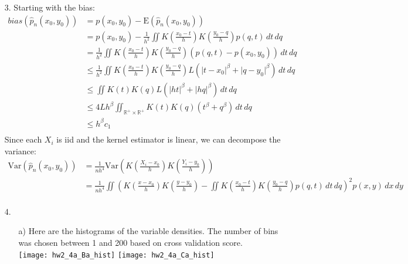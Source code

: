 \documentclass[11pt]{article}
\newcommand{\R}{\mathbb{R}}
\newcommand{\E}{\mathrm{E}}
\newcommand{\var}{\mathrm{Var}}
\theoremstyle{definition}
\begin{document}
\begin{itemize}
\begin{itemize}
        \end{itemize}
    \item[3.]
        Starting with the bias:
        \begin{align*}
            bias(\hat p_n(x_0,y_0)) &= p(x_0,y_0) - \E(\hat p_n(x_0,y_0)) \\
                                    &= p(x_0,y_0) - \frac{1}{h^2}\iint K\left(\frac{x_0-t}{h}\right)K\left(\frac{y_0-q}{h}\right)p(q,t)\,dt\,dq \\ 
                                    &= \frac{1}{h^2}\iint K\left(\frac{x_0-t}{h}\right)K\left(\frac{y_0-q}{h}\right)(p(q,t)-p(x_0,y_0))\,dt\,dq \\ 
                                    &\leq \frac{1}{h^2}\iint K\left(\frac{x_0-t}{h}\right)K\left(\frac{y_0-q}{h}\right)L(\lvert t - x_0 \rvert^\beta +\lvert q - y_0 \rvert^\beta )\,dt\,dq \\ 
                                    &\leq \iint K\left(t\right)K\left(q\right)L(\lvert ht \rvert^\beta +\lvert hq \rvert^\beta )\,dt\,dq \\ 
                                    &\leq 4Lh^\beta\iint_{\R^+\times\R^+} K\left(t\right)K\left(q\right)(t^\beta + q^\beta )\,dt\,dq \\ 
                                    &\leq h^\beta c_1\\ 
        \end{align*}
        Since each $X_i$ is iid and the kernel estimator is linear, we can decompose the variance:
        \begin{align*}
            \var\left(\hat p_n(x_0,y_0)\right) &= \frac{1}{nh^4}\var\left(K\left(\frac{X_i-x_0}{h}\right)K\left(\frac{Y_i-y_0}{h}\right)\right) \\
                                               &= \frac{1}{nh^4}\iint \left( K\left(\frac{x-x_0}{h}\right)K\left(\frac{y-y_0}{h}\right) - \iint K\left(\frac{x_0-t}{h}\right)K\left(\frac{y_0-q}{h}\right)p(q,t)\,dt\,dq\right)^2 p(x,y)\,dx\,dy \\
        \end{align*}
    \item[4.]
        \begin{itemize}
            \item[a)]
                Here are the histograms of the variable densities. The number of bins was chosen between 1 and 200 based on cross validation score.\\
                \texttt{[image: hw2\_4a\_Ba\_hist]}
                \texttt{[image: hw2\_4a\_Ca\_hist]} \\ 

\end{itemize}
\end{itemize}
\end{document}
